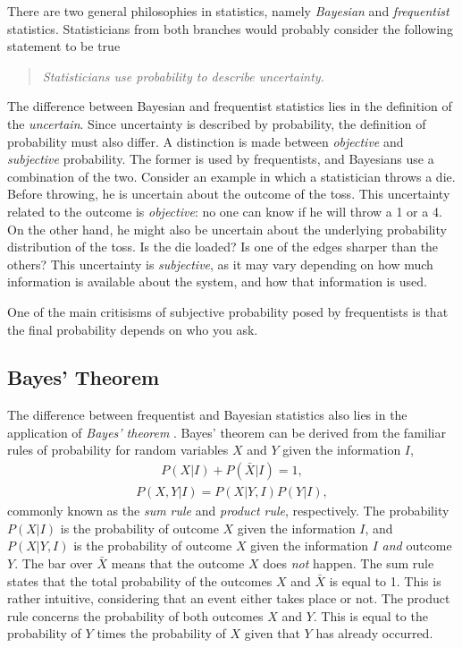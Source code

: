 \documentclass[twoside,english]{uiofysmaster}
\begin{document}
{{There are two general philosophies in statistics, namely \textit{Bayesian} and \textit{frequentist} statistics. Statisticians from both branches would probably consider the following statement to be true
\begin{quote}
\textit{Statisticians use probability to describe uncertainty.}
\end{quote}
The difference between Bayesian and frequentist statistics lies in the definition of the \textit{uncertain}. Since uncertainty is described by probability, the definition of probability must also differ. A distinction is made between \textit{objective} and \textit{subjective} probability. The former is used by frequentists, and Bayesians use a combination of the two. Consider an example in which a statistician throws a die. Before throwing, he is uncertain about the outcome of the toss. This uncertainty related to the outcome is \textit{objective}: no one can know if he will throw a 1 or a 4. On the other hand, he might also be uncertain about the underlying probability distribution of the toss. Is the die loaded? Is one of the edges sharper than the others? This uncertainty is \textit{subjective}, as it may vary depending on how much information is available about the system, and how that information is used. 

One of the main critisisms of subjective probability posed by frequentists is that the final probability depends on who you ask.

\subsection{Bayes' Theorem}

The difference between frequentist and Bayesian statistics also lies in the application of \textit{Bayes' theorem} \cite{mr1763essay}. Bayes' theorem can be derived from the familiar rules of probability for random variables $X$ and $Y$ given the information $I$,
\begin{align}\label{Eq:: gaussian process : Sum rule}
P(X | I) + P(\bar{X} | I) = 1,
\end{align}
\begin{align}
 \label{Eq:: gaussian process : Product rule}
P(X, Y | I) = P(X | Y, I)  P(Y | I),
\end{align} 
commonly known as the \textit{sum rule} and \textit{product rule}, respectively. The probability $P(X|I)$ is the probability of outcome $X$ given the information $I$, and $P(X|Y,I)$ is the probability of outcome $X$ given the information $I$ \textit{and} outcome $Y$. The bar over $\bar{X}$ means that the outcome $X$ does \textit{not} happen. The sum rule states that the total probability of the outcomes $X$ and $\bar{X}$ is equal to 1. This is rather intuitive, considering that an event either takes place or not. The product rule concerns the probability of both outcomes $X$ and $Y$. This is equal to the probability of $Y$ times the probability of $X$ given that $Y$ has already occurred. 

}}
\end{document}
